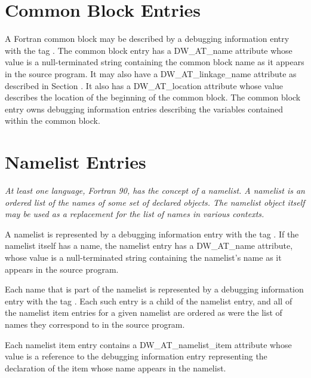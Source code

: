 \section{Common Block Entries}
\label{chap:commonblockentries}
A Fortran common block may be described by a debugging
information entry with the 
tag . 
The
common block entry has a DW\_AT\_name attribute whose value
is a null-terminated string containing the common block
name as it appears in the source program. It may also have a
DW\_AT\_linkage\_name attribute as described in 
Section . 
It
also has a DW\_AT\_location attribute whose value describes the
location of the beginning of the common block. The common
block entry owns debugging information entries describing
the variables contained within the common block.

\section{Namelist Entries}
\label{chap:namelistentries}
\textit{At least one language, Fortran 90, has the concept of a
namelist. A namelist is an ordered list of the names of some
set of declared objects. The namelist object itself may be used
as a replacement for the list of names in various contexts.}

A namelist is represented by a debugging information entry
with the 
tag . 
If the namelist itself has a
name, the namelist entry has a DW\_AT\_name attribute, whose
value is a null-terminated string containing the namelist’s
name as it appears in the source program.

Each name that is part of the namelist is represented
by a debugging information entry with the tag
. 
Each such entry is a child of the
namelist entry, and all of the namelist item entries for a
given namelist are ordered as were the list of names they
correspond to in the source program.

Each namelist item entry contains a DW\_AT\_namelist\_item
attribute whose value is a reference to the debugging
information entry representing the declaration of the item
whose name appears in the namelist.


